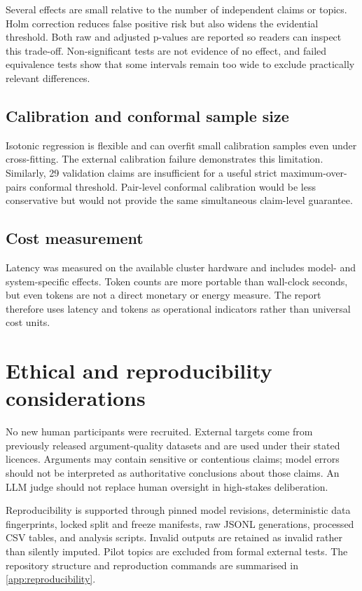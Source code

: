 \documentclass[11pt,twoside,a4paper]{report}
\begin{document}
Several effects are small relative to the number of independent claims or topics.
Holm correction reduces false positive risk but also widens the evidential threshold.
Both raw and adjusted p-values are reported so readers can inspect this trade-off.
Non-significant tests are not evidence of no effect, and failed equivalence tests
show that some intervals remain too wide to exclude practically relevant differences.

\subsection{Calibration and conformal sample size}

Isotonic regression is flexible and can overfit small calibration samples even under
cross-fitting.  The external calibration failure demonstrates this limitation.
Similarly, 29 validation claims are insufficient for a useful strict maximum-over-
pairs conformal threshold.  Pair-level conformal calibration would be less
conservative but would not provide the same simultaneous claim-level guarantee.

\subsection{Cost measurement}

Latency was measured on the available cluster hardware and includes model- and
system-specific effects.  Token counts are more portable than wall-clock seconds,
but even tokens are not a direct monetary or energy measure.  The report therefore
uses latency and tokens as operational indicators rather than universal cost units.

\section{Ethical and reproducibility considerations}

No new human participants were recruited.  External targets come from previously
released argument-quality datasets and are used under their stated licences.
Arguments may contain sensitive or contentious claims; model errors should not be
interpreted as authoritative conclusions about those claims.  An LLM judge should
not replace human oversight in high-stakes deliberation.

Reproducibility is supported through pinned model revisions, deterministic data
fingerprints, locked split and freeze manifests, raw JSONL generations, processed CSV
tables, and analysis scripts.  Invalid outputs are retained as invalid rather than
silently imputed.  Pilot topics are excluded from formal external tests.  The
repository structure and reproduction commands are summarised in
\cref{app:reproducibility}.
\end{document}
